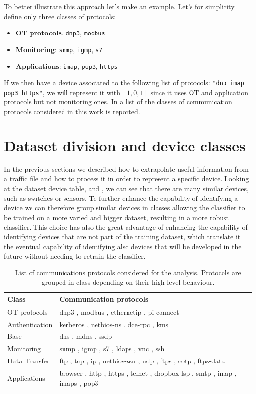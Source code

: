 To better illustrate this approach let's make an example. Let's for simplicity define only three classes of protocols:
\begin{itemize}[noitemsep, nolistsep]
    \item \textbf{OT protocols}: \texttt{dnp3}, \texttt{modbus}
    \item \textbf{Monitoring}: \texttt{snmp}, \texttt{igmp}, \texttt{s7}
    \item \textbf{Applications}: \texttt{imap}, \texttt{pop3}, \texttt{https}
\end{itemize}
If we then have a device associated to the following list of protocols: \texttt{"dnp imap pop3 https"}, we will represent it with $[1,0,1]$ since it uses OT and application protocols but not monitoring ones.
In  a list of the classes of communication protocols considered in this work is reported.


\section{Dataset division and device classes}

In the previous sections we described how to extrapolate useful information from a traffic file and how to process it in order to represent a specific device. Looking at the dataset device table,  and , we can see that there are many similar devices, such as switches or sensors. 
To further enhance the capability of identifying a device we can therefore group similar devices in classes allowing the classifier to be trained on a more varied and bigger dataset, resulting in a more robust classifier. This choice has also the great advantage of enhancing the capability of identifying devices that are not part of the training dataset, which translate it the eventual capability of identifying also devices that will be developed in the future without needing to retrain the classifier.
\begin{table}[h]
\centering
\begin{tabular}{|l|l|}
\hline
\textbf{Class} & \textbf{Communication protocols} \\
\hline
OT protocols   &  dnp3 ,  modbus ,  ethernetip ,   pi-connect \\
Authentication & kerberos ,  netbios-ns ,  dce-rpc ,  kms \\
Base           & dns ,  mdns ,  ssdp \\
Monitoring     & snmp ,  igmp ,  s7 ,  ldaps ,  vnc ,  ssh \\
Data Transfer  & ftp ,  tcp ,  ip ,  netbios-ssn ,  udp ,  ftps ,  cotp ,   ftps-data \\
Applications   & browser ,  http ,  https ,  telnet ,    dropbox-lsp ,  smtp ,  imap ,  imaps ,  pop3  \\
\hline
\end{tabular}
\caption{List of communications protocols considered for the analysis. Protocols are grouped in class depending on their high level behaviour.}
\label{tab:protolist}
\end{table}



